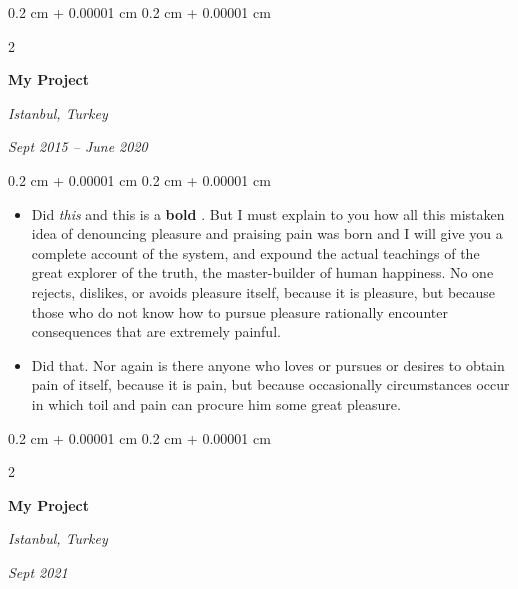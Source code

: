 \documentclass[10pt, letterpaper]{article}
\newenvironment{highlights}{
    \begin{itemize}[
        topsep=0.10 cm,
        parsep=0.10 cm,
        partopsep=0pt,
        itemsep=0pt,
        leftmargin=0.4 cm + 10pt
    ]
}{
    \end{itemize}
} %
\newenvironment{onecolentry}{
    \begin{adjustwidth}{
        0.2 cm + 0.00001 cm
    }{
        0.2 cm + 0.00001 cm
    }
}{
    \end{adjustwidth}
} %
\newenvironment{twocolentry}[2][]{
    \onecolentry
    \def\secondColumn{#2}
    \setcolumnwidth{\fill, 4.5 cm}
    \begin{paracol}{2}
}{
    \switchcolumn \raggedleft \secondColumn
    \end{paracol}
    \endonecolentry
} %
\let\hrefWithoutArrow\href
\renewcommand{\href}[2]{\hrefWithoutArrow{#1}{\ifthenelse{\equal{#2}{}}{ }{#2 }\raisebox{.15ex}{\footnotesize \faExternalLink*}}}
\begin{document}
        \vspace{0.2 cm}

        \begin{twocolentry}{
        \textit{Istanbul, Turkey}    
            
        \textit{Sept 2015 – June 2020}}
            \textbf{My Project}
        \end{twocolentry}

        \vspace{0.10 cm}
        \begin{onecolentry}
            \begin{highlights}
                \item Did \textit{this} and this is a \textbf{bold} \href{https://example.com}{link}. But I must explain to you how all this mistaken idea of denouncing pleasure and praising pain was born and I will give you a complete account of the system, and expound the actual teachings of the great explorer of the truth, the master-builder of human happiness. No one rejects, dislikes, or avoids pleasure itself, because it is pleasure, but because those who do not know how to pursue pleasure rationally encounter consequences that are extremely painful.
                \item Did that. Nor again is there anyone who loves or pursues or desires to obtain pain of itself, because it is pain, but because occasionally circumstances occur in which toil and pain can procure him some great pleasure.
            \end{highlights}
        \end{onecolentry}


        \vspace{0.2 cm}

        \begin{twocolentry}{
        \textit{Istanbul, Turkey}    
            
        \textit{Sept 2021}}
            \textbf{My Project}
        \end{twocolentry}
\end{document}
